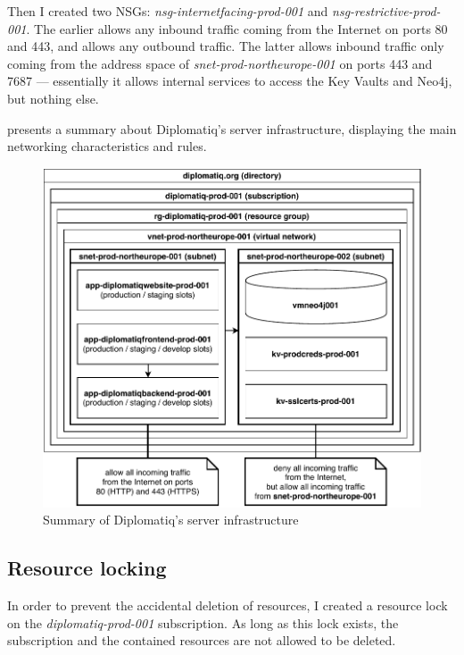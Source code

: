 Then I created two NSGs: \emph{nsg-internetfacing-prod-001} and \emph{nsg-restrictive-prod-001}. The earlier allows any inbound traffic coming from the Internet on ports 80 and 443, and allows any outbound traffic. The latter allows inbound traffic only coming from the address space of \emph{snet-prod-northeurope-001} on ports 443 and 7687 — essentially it allows internal services to access the Key Vaults and Neo4j, but nothing else.

 presents a summary about Diplomatiq's server infrastructure, displaying the main networking characteristics and rules.

\begin{figure}[!htb]
    \centering
    \includegraphics[width=\textwidth]{figures/infrastructure.pdf}
    \caption{Summary of Diplomatiq's server infrastructure}
    \label{fig:infrastructure}
\end{figure}

\subsection{Resource locking}

In order to prevent the accidental deletion of resources, I created a resource lock on the \emph{diplomatiq-prod-001} subscription. As long as this lock exists, the subscription and the contained resources are not allowed to be deleted.
